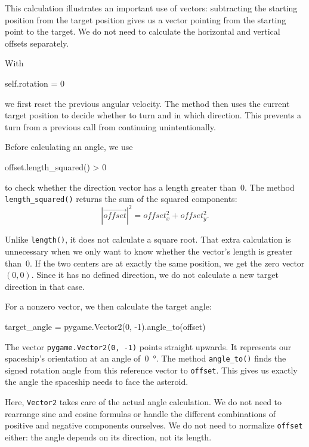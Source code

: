 This calculation illustrates an important use of vectors: subtracting the starting position from the target position gives us a vector pointing from the starting point to the target. We do not need to calculate the horizontal and vertical offsets separately.

With
\begin{codebox}
	self.rotation = 0
\end{codebox}
we first reset the previous angular velocity. The method then uses the current target position to decide whether to turn and in which direction. This prevents a turn from a previous call from continuing unintentionally.

Before calculating an angle, we use
\begin{codebox}
	offset.length_squared() > 0
\end{codebox}
to check whether the direction vector has a length greater than~0. The method \texttt{length\-\_squared()} returns the sum of the squared components:
\[
|\overrightarrow{offset}|^2 = offset_x^2 + offset_y^2.
\]

Unlike \texttt{length()}, it does not calculate a square root. That extra calculation is unnecessary when we only want to know whether the vector's length is greater than~0. If the two centers are at exactly the same position, we get the zero vector $(0,0)$. Since it has no defined direction, we do not calculate a new target direction in that case.

For a nonzero vector, we then calculate the target angle:
\begin{codebox}
	target_angle = pygame.Vector2(0, -1).angle_to(offset) %
\end{codebox}

The vector \texttt{pygame.Vector2(0, -1)} points straight upwards. It represents our spaceship's orientation at an angle of~\SI{0}{\degree}. The method \texttt{angle\_to()} finds the signed rotation angle from this reference vector to \texttt{offset}. This gives us exactly the angle the spaceship needs to face the asteroid.

Here, \texttt{Vector2} takes care of the actual angle calculation. We do not need to rearrange sine and cosine formulas or handle the different combinations of positive and negative components ourselves. We do not need to normalize \texttt{offset} either: the angle depends on its direction, not its length.

